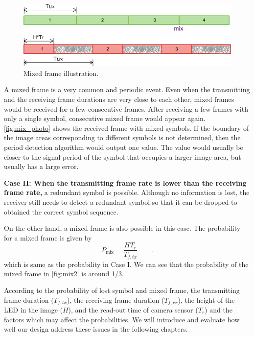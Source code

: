 \begin{figure}[!t]
  \centering
  \includegraphics[scale=0.35]{fig/mix.png}
  \caption{Mixed frame illustration.}
  \label{fig:mix}
\end{figure}

A mixed frame is a very common and periodic event. Even when the transmitting and the receiving frame durations are very close to each other, mixed frames would be received for a few consecutive frames. After receiving a few frames with only a single symbol, consecutive mixed frame would appear again. \autoref{fig:mix_photo} shows the received frame with mixed symbols.
If the boundary of the image areas corresponding to different symbols is not determined, then the period detection algorithm would output one value. The value would usually be closer to the signal period of the symbol that occupies a larger image area, but usually has a large error.  


\textbf{Case II: When the transmitting frame rate is lower than the receiving frame rate,}
a redundant symbol is possible. Although no information is lost, the receiver still needs to detect a redundant symbol so that it can be dropped to obtained the correct symbol sequence.  


On the other hand, a mixed frame is also possible in this case. The probability for a mixed frame is given by
\begin{equation}
P_{\operatorname{mix}}=\frac{H T_r}{T_{f,tx}} \qquad \textrm{.}
\end{equation}
which is same as the probability in Case I.
We can see that the probability of the mixed frame in \autoref{fig:mix2} is around 1/3. 

According to the probability of lost symbol and mixed frame, the transmitting frame duration ($T_{f,tx}$), the receiving frame duration ($T_{f,rx}$), the height of the LED in the image ($H$), and the read-out time of camera sensor ($T_r$) and the factors which may affect the probabilities. We will introduce and evaluate how well our design address these issues in the following chapters.
